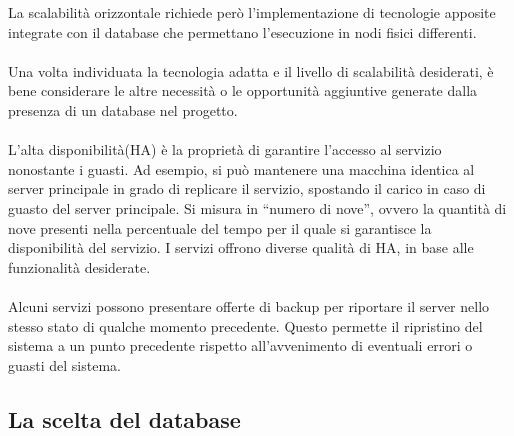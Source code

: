 La scalabilità orizzontale richiede però l'implementazione 
di tecnologie apposite integrate con il database che permettano l'esecuzione in nodi fisici differenti. \\
\\
Una volta individuata la tecnologia adatta e il livello di scalabilità desiderati, 
è bene considerare le altre necessità o le opportunità aggiuntive generate 
dalla presenza di un database nel progetto. \\
\\
L’alta disponibilità(HA) è la proprietà di garantire l’accesso al servizio nonostante i guasti. 
Ad esempio, si può mantenere una macchina identica al server principale in grado di replicare il servizio, 
spostando il carico in caso di guasto del server principale. 
Si misura in “numero di nove”, ovvero la quantità di nove presenti 
nella percentuale del tempo per il quale si garantisce la disponibilità del servizio.
I servizi offrono diverse qualità di HA, in base alle funzionalità desiderate.\\
\\
Alcuni servizi possono presentare offerte di backup 
per riportare il server nello stesso stato di qualche momento precedente.
Questo permette il ripristino del sistema a un punto precedente 
rispetto all'avvenimento di eventuali errori o guasti del sistema.\\
\subsection{La scelta del database}

